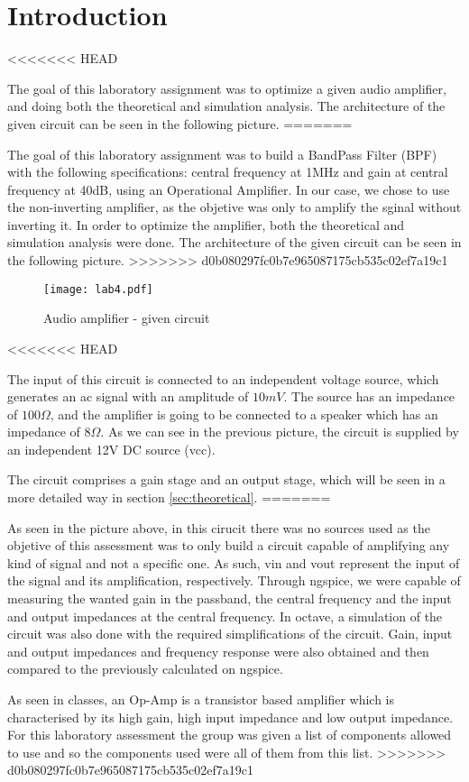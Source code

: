 \section{Introduction}
\label{sec:introduction}

<<<<<<< HEAD
\par The goal of this laboratory assignment was to optimize a given audio amplifier, and doing both the theoretical and simulation analysis. The architecture of the given circuit can be seen in the following picture.
=======
\par The goal of this laboratory assignment was to build a BandPass Filter (BPF) with the following specifications: central frequency at 1MHz and gain at central frequency at 40dB, using an Operational Amplifier. In our case, we chose to use the non-inverting amplifier, as the objetive was only to amplify the sginal without inverting it. In order to optimize the amplifier, both the theoretical and simulation analysis were done. The architecture of the given circuit can be seen in the following picture.
>>>>>>> d0b080297fc0b7e965087175cb535c02ef7a19c1

\begin{figure}[H] \centering
	\texttt{[image: lab4.pdf]}
	\caption{Audio amplifier - given circuit}
	\label{fig:1}
\end{figure}

<<<<<<< HEAD
\par The input of this circuit is connected to an independent voltage source, which generates an ac signal with an amplitude of $10mV$. The source has an impedance of $100\Omega$, and the amplifier is going to be connected to a speaker which has an impedance of $8\Omega$. As we can see in the previous picture, the circuit is supplied by an independent 12V DC source (vcc).
\par The circuit comprises a gain stage and an output stage, which will be seen in a more detailed way in section \ref{sec:theoretical}. 
=======
\par As seen in the picture above, in this cirucit there was no sources used as the objetive of this assessment was to only build a circuit capable of amplifying any kind of signal and not a specific one. As such, vin and vout represent the input of the signal and its amplification, respectively. Through ngspice,  we were capable of measuring the wanted gain in the passband, the central frequency and the input and output impedances at the central frequency. In octave, a simulation of the circuit was also done with the required simplifications of the circuit. Gain, input and output impedances and frequency response were also obtained and then compared to the previously calculated on ngspice.

\par As seen in classes, an Op-Amp is a transistor based amplifier which is characterised by its high gain, high input impedance and low output impedance. For this laboratory assessment the group was given a list of components allowed to use and so the components used were all of them from this list.
>>>>>>> d0b080297fc0b7e965087175cb535c02ef7a19c1

\newpage
